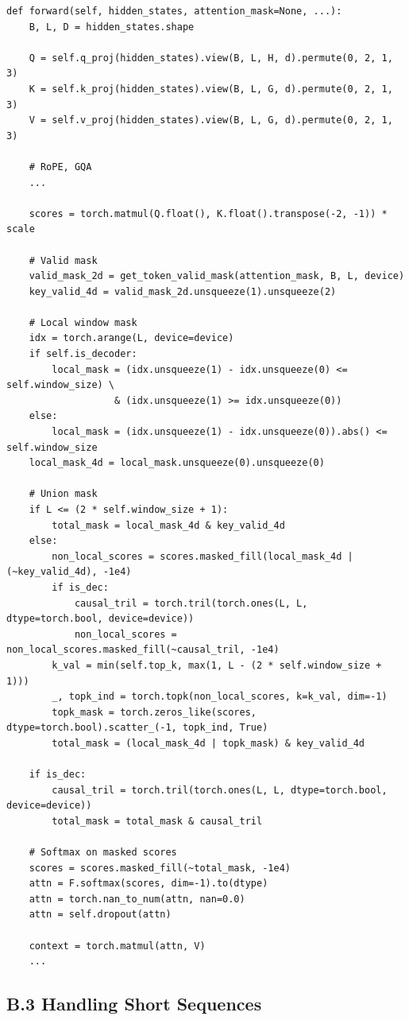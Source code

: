 \begin{lstlisting}
def forward(self, hidden_states, attention_mask=None, ...):
    B, L, D = hidden_states.shape
    
    Q = self.q_proj(hidden_states).view(B, L, H, d).permute(0, 2, 1, 3)
    K = self.k_proj(hidden_states).view(B, L, G, d).permute(0, 2, 1, 3)
    V = self.v_proj(hidden_states).view(B, L, G, d).permute(0, 2, 1, 3)
    
    # RoPE, GQA
    ...
    
    scores = torch.matmul(Q.float(), K.float().transpose(-2, -1)) * scale
    
    # Valid mask
    valid_mask_2d = get_token_valid_mask(attention_mask, B, L, device)
    key_valid_4d = valid_mask_2d.unsqueeze(1).unsqueeze(2)
    
    # Local window mask
    idx = torch.arange(L, device=device)
    if self.is_decoder:
        local_mask = (idx.unsqueeze(1) - idx.unsqueeze(0) <= self.window_size) \
                   & (idx.unsqueeze(1) >= idx.unsqueeze(0))
    else:
        local_mask = (idx.unsqueeze(1) - idx.unsqueeze(0)).abs() <= self.window_size
    local_mask_4d = local_mask.unsqueeze(0).unsqueeze(0)
    
    # Union mask
    if L <= (2 * self.window_size + 1):
        total_mask = local_mask_4d & key_valid_4d
    else:
        non_local_scores = scores.masked_fill(local_mask_4d | (~key_valid_4d), -1e4)
        if is_dec:
            causal_tril = torch.tril(torch.ones(L, L, dtype=torch.bool, device=device))
            non_local_scores = non_local_scores.masked_fill(~causal_tril, -1e4)
        k_val = min(self.top_k, max(1, L - (2 * self.window_size + 1)))
        _, topk_ind = torch.topk(non_local_scores, k=k_val, dim=-1)
        topk_mask = torch.zeros_like(scores, dtype=torch.bool).scatter_(-1, topk_ind, True)
        total_mask = (local_mask_4d | topk_mask) & key_valid_4d
    
    if is_dec:
        causal_tril = torch.tril(torch.ones(L, L, dtype=torch.bool, device=device))
        total_mask = total_mask & causal_tril
    
    # Softmax on masked scores
    scores = scores.masked_fill(~total_mask, -1e4)
    attn = F.softmax(scores, dim=-1).to(dtype)
    attn = torch.nan_to_num(attn, nan=0.0)
    attn = self.dropout(attn)
    
    context = torch.matmul(attn, V)
    ...
\end{lstlisting}

\subsection{B.3 Handling Short Sequences}

